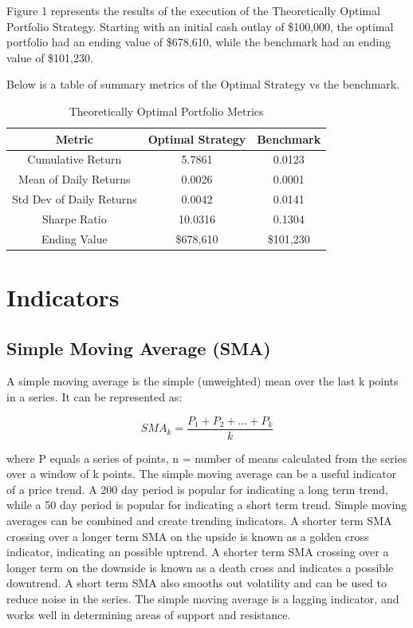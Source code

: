 \documentclass[
	letterpaper, %
]{jdf}
\begin{document}
Figure 1 represents the results of the execution of the Theoretically Optimal Portfolio Strategy.  Starting with an initial cash outlay of \$100,000, the optimal portfolio had an ending value of \$678,610, while the benchmark had an ending value of \$101,230.  

\pagebreak 

Below is a table of summary metrics of the Optimal Strategy vs the benchmark.

\begin{table}[h]
\centering
\begin{tabular}{ c | c | c}
  \hline
  Metric & Optimal Strategy & Benchmark \\
  \hline   
 
Cumulative Return & 5.7861 & 0.0123 \\
Mean of Daily Returns & 0.0026 & 0.0001 \\
Std Dev of Daily Returns & 0.0042 & 0.0141 \\
Sharpe Ratio & 10.0316 & 0.1304 \\
Ending Value & \$678,610 & \$101,230 \\
  \hline
\end{tabular}
\caption{Theoretically Optimal Portfolio Metrics}
\label{tbl:topic_overlap}
\end{table}

\section{Indicators}

\subsection{Simple Moving Average (SMA)}

A simple moving average is the simple (unweighted) mean over the last k points in a series. It can be represented as:

\begin{equation}
SMA_{k} = \frac{P_{1} + P_{2} + ... + P_{k}}{k} 
\end{equation}

where P equals a series of points, n = number of means calculated from the series over a window of k points.  The simple moving average can be a useful indicator of a price trend. A 200 day period is popular for indicating a long term trend, while a 50 day period is popular for indicating a short term trend. Simple moving averages can be combined and create trending indicators.  A shorter term SMA crossing over a longer term SMA on the upside is known as a golden cross indicator, indicating an possible uptrend.  A shorter term SMA crossing over a longer term on the downside is known as a death cross and indicates a possible downtrend. A short term SMA also smooths out volatility and can be used to reduce noise in the series. The simple moving average is a lagging indicator, and works well in determining areas of support and resistance. 
\end{document}
